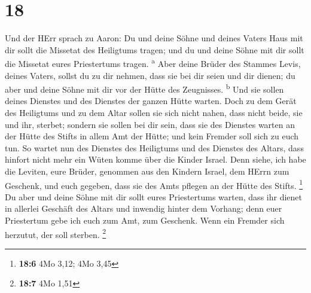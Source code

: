 \hypertarget{section-17}{%
\section{18}\label{section-17}}

 Und der HErr sprach zu Aaron: Du und deine Söhne und
deines Vaters Haus mit dir sollt die Missetat des Heiligtums tragen; und
du und deine Söhne mit dir sollt die Missetat eures Priestertums tragen.
\textsuperscript{a}  Aber deine Brüder des Stammes Levis,
deines Vaters, sollst du zu dir nehmen, dass sie bei dir seien und dir
dienen; du aber und deine Söhne mit dir vor der Hütte des Zeugnisses.
\textsuperscript{b}  Und sie sollen deines Dienstes und
des Dienstes der ganzen Hütte warten. Doch zu dem Gerät des Heiligtums
und zu dem Altar sollen sie sich nicht nahen, dass nicht beide, sie und
ihr, sterbet;  sondern sie sollen bei dir sein, dass sie
des Dienstes warten an der Hütte des Stifts in allem Amt der Hütte; und
kein Fremder soll sich zu euch tun.  So wartet nun des
Dienstes des Heiligtums und des Dienstes des Altars, dass hinfort nicht
mehr ein Wüten komme über die Kinder Israel.  Denn siehe,
ich habe die Leviten, eure Brüder, genommen aus den Kindern Israel, dem
HErrn zum Geschenk, und euch gegeben, dass sie des Amts pflegen an der
Hütte des Stifts. \footnote{\textbf{18:6} 4Mo 3,12; 4Mo 3,45}
 Du aber und deine Söhne mit dir sollt eures Priestertums
warten, dass ihr dienet in allerlei Geschäft des Altars und inwendig
hinter dem Vorhang; denn euer Priestertum gebe ich euch zum Amt, zum
Geschenk. Wenn ein Fremder sich herzutut, der soll sterben. \footnote{\textbf{18:7}
  4Mo 1,51}

